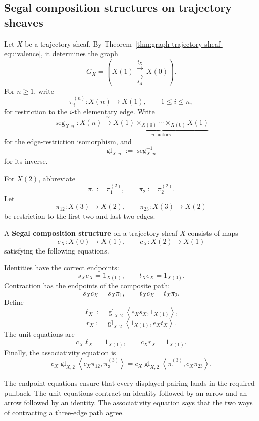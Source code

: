 \subsection{Segal composition structures on trajectory sheaves}
\label{subsec:classification-segal-enhancements}

Let \(X\) be a trajectory sheaf. By
Theorem~\ref{thm:graph-trajectory-sheaf-equivalence}, it determines the graph
\[
    G_X=
    \left(
    X(1)
    \mathrel{\substack{\xrightarrow{t_X}\\[-0.4em]\xrightarrow[s_X]{}}}
    X(0)
    \right).
\]
For \(n\geq1\), write
\[
    \pi_i^{(n)}:X(n)\to X(1),
    \qquad
    1\leq i\leq n,
\]
for restriction to the \(i\)-th elementary edge. Write
\[
    \operatorname{seg}_{X,n}:
    X(n)
    \xrightarrow{\cong}
    \underbrace{
    X(1)\times_{X(0)}\cdots\times_{X(0)}X(1)
    }_{n\text{ factors}}
\]
for the edge-restriction isomorphism, and
\[
    \operatorname{gl}_{X,n}:=\operatorname{seg}_{X,n}^{-1}
\]
for its inverse.

For \(X(2)\), abbreviate
\[
    \pi_1:=\pi_1^{(2)},
    \qquad
    \pi_2:=\pi_2^{(2)}.
\]
Let
\[
    \pi_{12}:X(3)\to X(2),
    \qquad
    \pi_{23}:X(3)\to X(2)
\]
be restriction to the first two and last two edges.

\begin{definition}
\label{def:segal-enhancement}
A \textbf{Segal composition structure} on a trajectory sheaf \(X\) consists
of maps
\[
    e_X:X(0)\to X(1),
    \qquad
    c_X:X(2)\to X(1)
\]
satisfying the following equations.

Identities have the correct endpoints:
\[
    s_Xe_X=1_{X(0)},
    \qquad
    t_Xe_X=1_{X(0)}.
\]
Contraction has the endpoints of the composite path:
\[
    s_Xc_X=s_X\pi_1,
    \qquad
    t_Xc_X=t_X\pi_2.
\]
Define
\[
    \ell_X
    :=
    \operatorname{gl}_{X,2}
    \left\langle
        e_Xs_X,
        1_{X(1)}
    \right\rangle,
\]
\[
    r_X
    :=
    \operatorname{gl}_{X,2}
    \left\langle
        1_{X(1)},
        e_Xt_X
    \right\rangle.
\]
The unit equations are
\[
    c_X\ell_X=1_{X(1)},
    \qquad
    c_Xr_X=1_{X(1)}.
\]
Finally, the associativity equation is
\[
    c_X\operatorname{gl}_{X,2}
    \left\langle
        c_X\pi_{12},
        \pi_3^{(3)}
    \right\rangle
    =
    c_X\operatorname{gl}_{X,2}
    \left\langle
        \pi_1^{(3)},
        c_X\pi_{23}
    \right\rangle.
\]
\end{definition}

The endpoint equations ensure that every displayed pairing lands in the
required pullback. The unit equations contract an identity followed by an
arrow and an arrow followed by an identity. The associativity equation says
that the two ways of contracting a three-edge path agree.

